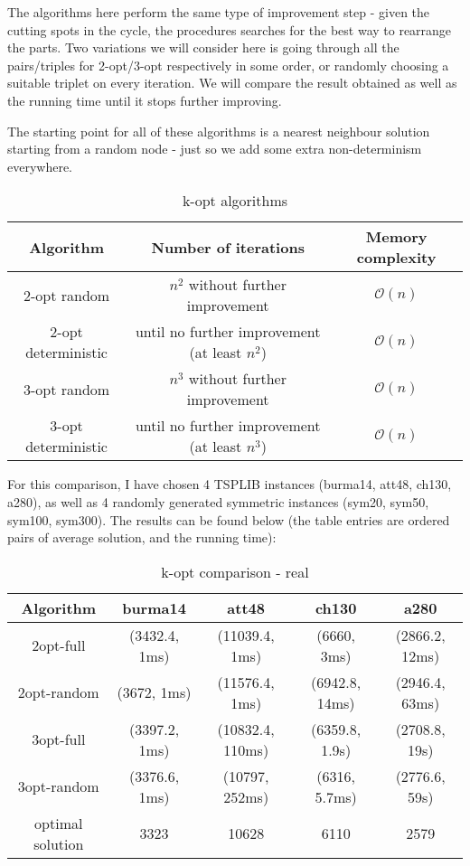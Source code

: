 \documentclass[12pt,twoside,notitlepage]{report}
\begin{document}
The algorithms here perform the same type of improvement step - given the cutting spots in the cycle, the procedures searches for the best way to rearrange the parts. Two variations we will consider here is going through all the pairs/triples for 2-opt/3-opt respectively in some order, or randomly choosing a suitable triplet on every iteration. We will compare the result obtained as well as the running time until it stops further improving.

The starting point for all of these algorithms is a nearest neighbour solution starting from a random node - just so we add some extra non-determinism everywhere.

\begin{table}[h!]
\centering
\begin{tabular}{||c | c | c||} 
 \hline
 Algorithm & Number of iterations & Memory complexity \\ [0.5ex] 
 \hline\hline
 2-opt random & $n^2$ without further improvement & $\mathcal{O}(n)$ \\
 2-opt deterministic & until no further improvement (at least $n^2$) & $\mathcal{O}(n)$ \\
 3-opt random  & $n^3$ without further improvement & $\mathcal{O}(n)$ \\
 3-opt deterministic  & until no further improvement (at least $n^3$) & $\mathcal{O}(n)$ \\
 \hline
\end{tabular}
\caption{k-opt algorithms}
\label{table:3}
\end{table}

For this comparison, I have chosen 4 TSPLIB instances (burma14, att48, ch130, a280), as well as 4 randomly generated symmetric instances (sym20, sym50, sym100, sym300). The results can be found below (the table entries are ordered pairs of average solution, and the running time):

\begin{table}[h!]
\centering
\begin{tabular}{||c || c | c | c | c||} 
 \hline
 Algorithm & burma14 & att48 & ch130 & a280 \\ [0.5ex] 
 \hline\hline
 2opt-full & (3432.4, 1ms) & (11039.4, 1ms) & (6660, 3ms) & (2866.2, 12ms) \\
 2opt-random & (3672, 1ms) & (11576.4, 1ms) & (6942.8, 14ms) & (2946.4, 63ms) \\
 3opt-full & (3397.2, 1ms) & (10832.4, 110ms) & (6359.8, 1.9s) & (2708.8, 19s) \\
 3opt-random & (3376.6, 1ms) & (10797, 252ms) & (6316, 5.7ms) & (2776.6, 59s) \\
 \hline\hline
 optimal solution & 3323 & 10628 & 6110 & 2579 \\
 \hline
\end{tabular}
\caption{k-opt comparison - real}
\label{comparison:2}
\end{table}
\end{document}
